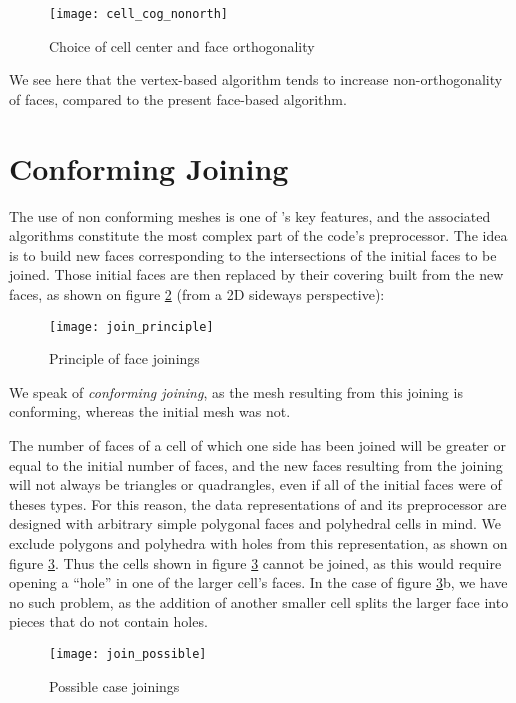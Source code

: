 \begin{figure}[!h]
\centerline{
\texttt{[image: cell\_cog\_nonorth]}}
\caption{Choice of cell center and face orthogonality}
\label{fig:algo.cog_cel.nonorth}
\end{figure}

We see here that the vertex-based algorithm tends to increase
non-orthogonality of faces, compared to the present
face-based algorithm.

\section*{Conforming Joining\label{sec:join}}

The use of non conforming meshes is one of \CS's key features, and
the associated algorithms constitute the most complex part of the
code's preprocessor. The idea is to build new faces corresponding to
the intersections of the initial faces to be joined.
Those initial faces are then replaced by their covering built
from the new faces, as shown on figure \ref{fig:algo.join.principle}
(from a 2D sideways perspective):

\begin{figure}[!h]
\centerline{
\texttt{[image: join\_principle]}}
\caption{Principle of face joinings}
\label{fig:algo.join.principle}
\end{figure}

We speak of \emph{conforming joining}, as the mesh resulting from
this joining is conforming, whereas the initial mesh was not.

The number of faces of a cell of which one side has been joined will
be greater or equal to the initial number of faces, and the new faces
resulting from the joining will not always be triangles or quadrangles,
even if all of the initial faces were of theses types. For this
reason, the data representations of \CS and its preprocessor
are designed with arbitrary simple polygonal faces and polyhedral
cells in mind. We exclude polygons and polyhedra with holes from
this representation, as shown on figure \ref{fig:algo.join.possible}.
Thus the cells shown in figure \ref{fig:algo.join.possible} cannot be
joined, as this would require opening a ``hole'' in one of the larger
cell's faces. In the case of figure \ref{fig:algo.join.possible}b, we
have no such problem, as the addition of another smaller cell
splits the larger face into pieces that do not contain holes.

\begin{figure}[!h]
\centerline{
\texttt{[image: join\_possible]}}
\caption{Possible case joinings}
\label{fig:algo.join.possible}
\end{figure}

